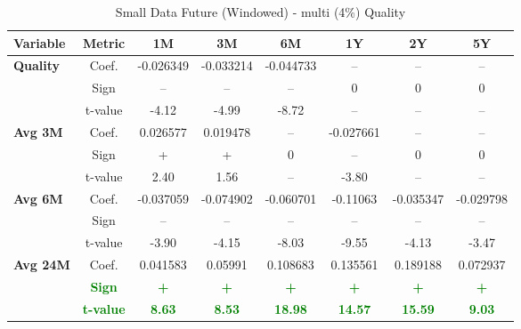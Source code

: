 \documentclass[11pt,english,a4paper,hidelinks]{book}
\begin{document}
\begin{table}[H]
    \centering
    \caption{Small Data Future (Windowed) - \acrshort{multi} (4\%) Quality}
    \begin{tabular}{lccccccc}
        \toprule
        \textbf{Variable} & \textbf{Metric} & \textbf{1M} & \textbf{3M} & \textbf{6M} & \textbf{1Y} & \textbf{2Y} & \textbf{5Y} \\
        \midrule
        \multirow{3}{*}{\textbf{Quality}}
            & Coef.   & -0.026349 & -0.033214 & -0.044733 & --        & --        & --        \\
            & Sign    & –         & –         & –         & 0         & 0         & 0         \\
            & t-value & -4.12     & -4.99     & -8.72     & --        & --        & --        \\
        \cmidrule{1-8}
        \multirow{3}{*}{\textbf{Avg 3M}}
            & Coef.   & 0.026577  & 0.019478  & --        & -0.027661 & --        & --        \\
            & Sign    & +         & +         & 0         & –         & 0         & 0         \\
            & t-value & 2.40      & 1.56      & --        & -3.80     & --        & --        \\
        \cmidrule{1-8}
        \multirow{3}{*}{\textbf{Avg 6M}}
            & Coef.   & -0.037059 & -0.074902 & -0.060701 & -0.11063  & -0.035347 & -0.029798 \\
            & Sign    & –         & –         & –         & –         & –         & –         \\
            & t-value & -3.90     & -4.15     & -8.03     & -9.55     & -4.13     & -3.47     \\
        \cmidrule{1-8}
        \multirow{3}{*}{\textbf{Avg 24M}}
            & Coef.   & 0.041583  & 0.05991   & 0.108683  & 0.135561  & 0.189188  & 0.072937  \\
            & \textbf{\textcolor{green}{Sign}}
                     & \textbf{\textcolor{green}{+}}
                     & \textbf{\textcolor{green}{+}}
                     & \textbf{\textcolor{green}{+}}
                     & \textbf{\textcolor{green}{+}}
                     & \textbf{\textcolor{green}{+}}
                     & \textbf{\textcolor{green}{+}} \\
            & \textbf{\textcolor{green}{t-value}}
                     & \textbf{\textcolor{green}{8.63}}
                     & \textbf{\textcolor{green}{8.53}}
                     & \textbf{\textcolor{green}{18.98}}
                     & \textbf{\textcolor{green}{14.57}}
                     & \textbf{\textcolor{green}{15.59}}
                     & \textbf{\textcolor{green}{9.03}} \\
        
        \bottomrule
    \end{tabular}
    \label{tab:quality_windowed_reformat}
\end{table}
\end{document}
